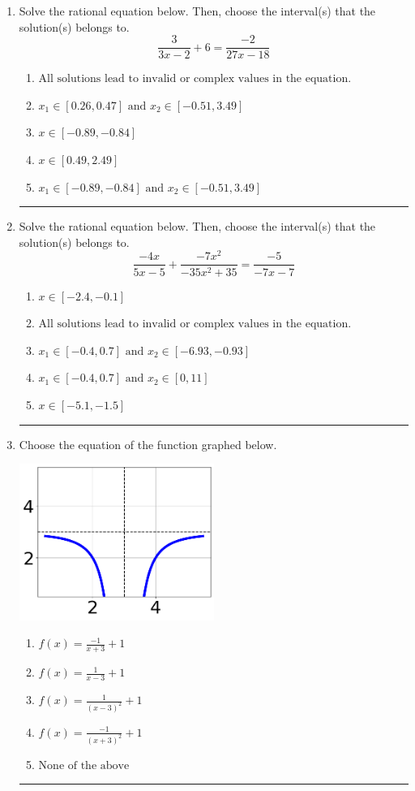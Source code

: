 \documentclass[14pt]{extbook}
\newcommand{\litem}[1]{\item#1\hspace*{-1cm}\rule{\textwidth}{0.4pt}}
\begin{document}
\begin{enumerate}
{\begin{enumerate}[label=\Alph*.]
\end{enumerate} }
\litem{
Solve the rational equation below. Then, choose the interval(s) that the solution(s) belongs to.\[ \frac{3}{3x -2} + 6 = \frac{-2}{27x -18} \]\begin{enumerate}[label=\Alph*.]
\item \( \text{All solutions lead to invalid or complex values in the equation.} \)
\item \( x_1 \in [0.26, 0.47] \text{ and } x_2 \in [-0.51,3.49] \)
\item \( x \in [-0.89,-0.84] \)
\item \( x \in [0.49,2.49] \)
\item \( x_1 \in [-0.89, -0.84] \text{ and } x_2 \in [-0.51,3.49] \)

\end{enumerate} }
\litem{
Solve the rational equation below. Then, choose the interval(s) that the solution(s) belongs to.\[ \frac{-4x}{5x -5} + \frac{-7x^{2}}{-35x^{2} + 35} = \frac{-5}{-7x -7} \]\begin{enumerate}[label=\Alph*.]
\item \( x \in [-2.4,-0.1] \)
\item \( \text{All solutions lead to invalid or complex values in the equation.} \)
\item \( x_1 \in [-0.4, 0.7] \text{ and } x_2 \in [-6.93,-0.93] \)
\item \( x_1 \in [-0.4, 0.7] \text{ and } x_2 \in [0,11] \)
\item \( x \in [-5.1,-1.5] \)

\end{enumerate} }
\litem{
Choose the equation of the function graphed below.
\begin{center}
    \includegraphics[width=0.5\textwidth]{../Figures/rationalGraphToEquationC.png}
\end{center}
\begin{enumerate}[label=\Alph*.]
\item \( f(x) = \frac{-1}{x + 3} + 1 \)
\item \( f(x) = \frac{1}{x - 3} + 1 \)
\item \( f(x) = \frac{1}{(x - 3)^2} + 1 \)
\item \( f(x) = \frac{-1}{(x + 3)^2} + 1 \)
\item \( \text{None of the above} \)

\end{enumerate} }
\end{enumerate}
\end{document}
